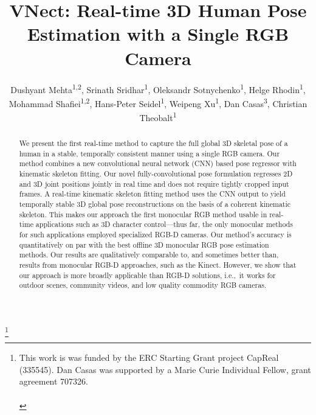 \documentclass[acmtog]{acmart}
\newcommand{\ie}{i.e.,\ }
\newcommand{\change}[1]{{#1}}
\begin{document}
\title{VNect: Real-time 3D Human Pose Estimation with a Single RGB Camera}

\author{Dushyant Mehta\textsuperscript{1,2}, Srinath Sridhar\textsuperscript{1}, Oleksandr Sotnychenko\textsuperscript{1},
  Helge Rhodin\textsuperscript{1}, Mohammad Shafiei\textsuperscript{1,2}, Hans-Peter Seidel\textsuperscript{1},
  Weipeng Xu\textsuperscript{1}, Dan Casas\textsuperscript{3}, Christian Theobalt\textsuperscript{1}
}

\renewcommand{\shortauthors}{D. Mehta et. al.}


\begin{abstract}
We present the first real-time method to capture the full global 3D skeletal pose of a human in a stable, temporally consistent \change{manner using} a single RGB camera.
Our method combines a new convolutional neural network (CNN) based pose regressor with kinematic skeleton fitting.
Our \change{novel} fully-convolutional pose formulation regresses 2D and 3D joint positions jointly in real time and does not \change{require} tightly cropped input frames.
\change{A real-time kinematic skeleton fitting method uses the CNN output to }yield temporally stable 3D global pose reconstructions on the basis of a coherent kinematic skeleton.
This makes our approach the first monocular RGB method usable in real-time applications such as 3D character control---thus far, the only monocular methods for such applications employed specialized \mbox{RGB-D} cameras.
Our method's accuracy is quantitatively on par with the best offline \change{3D monocular RGB} pose \change{estimation} methods.
Our results are qualitatively comparable to, and sometimes better than, results from monocular \mbox{RGB-D} approaches, such as the Kinect.
However, we show that our approach is more broadly applicable than \mbox{RGB-D} solutions, \ie \change{it works} for outdoor scenes, \change{community videos, and low quality commodity RGB cameras}.
\end{abstract}



\thanks{This work is was funded by the ERC Starting Grant project CapReal (335545).
Dan Casas was supported by a Marie Curie Individual Fellow, grant agreement 707326.\ \\ \ \\}
\end{document}
